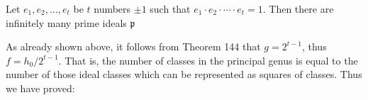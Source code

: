 Let $e_1, e_2, \ldots, e_t$ be $t$ numbers $\pm 1$ such that $e_1 \cdot e_2 \cdot \cdots \cdot e_t = 1$. Then there are infinitely many prime ideals $\mathfrak{p}$

As already shown above, it follows from Theorem 144 that $g = 2^{t-1}$, thus $f = h_0/2^{t-1}$. That is, the number of classes in the principal genus is equal to the number of those ideal classes which can be represented as squares of classes. Thus we have proved:
